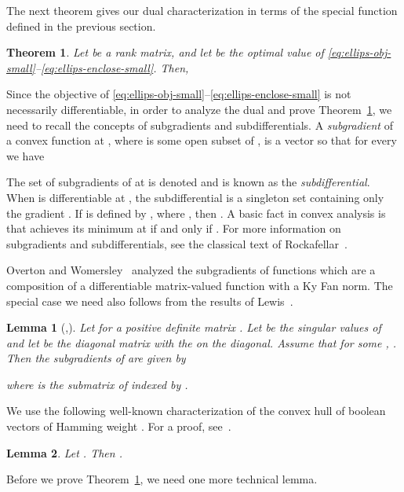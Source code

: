 \documentclass{article}
\newtheorem{theorem}{Theorem}[section]
\newtheorem{lemma}{Lemma}[theorem]
\begin{document}
The next theorem gives our dual characterization in terms of the
special function  defined in the previous section.

\begin{theorem}\label{thm:nuclear-small}
  Let  be a rank
   matrix, and let  be the optimal value of
  \eqref{eq:ellips-obj-small}--\eqref{eq:ellips-enclose-small}. Then,
  
\end{theorem}

Since the objective of
\eqref{eq:ellips-obj-small}--\eqref{eq:ellips-enclose-small} is not
necessarily differentiable, in order to analyze the dual and prove
Theorem~\ref{thm:nuclear-small}, we need to recall the concepts of
subgradients and subdifferentials. A \emph{subgradient} of a convex
function  at , where  is some open subset
of , is a vector  so that for every  we
have

The set of subgradients of  at  is denoted  and
is known as the \emph{subdifferential}. When  is differentiable at
, the subdifferential is a singleton set containing only the
gradient . If  is defined by ,
where  , then . A basic fact in convex analysis is that 
achieves its minimum at   if and only if . For
more information on subgradients and subdifferentials, see the
classical text of Rockafellar~\cite{Rockafellar}. 

Overton and Womersley~\cite{OvertonW93-kyfan} analyzed the
subgradients of functions which are a composition of a differentiable
matrix-valued function with a Ky Fan norm. The special case we need
also follows from the results of Lewis~\cite{Lewis95-matfunc}.
\begin{lemma}[\cite{OvertonW93-kyfan},\cite{Lewis95-matfunc}]\label{lm:kyfan-subgr}
  Let  for a positive definite
  matrix . Let  be the
  singular values of  and let  be the diagonal matrix
  with the  on the diagonal. Assume that for some , . Then the subgradients of  are
  given by
  
  where  is the submatrix of  indexed by . 
\end{lemma}

We use the following well-known characterization of the convex
hull of boolean vectors of Hamming weight . For a proof,
see~\cite{schrijver-combop-B}. 

\begin{lemma}\label{lm:unik-poly}
  Let . Then
  . 
\end{lemma}

Before we prove Theorem~\ref{thm:nuclear-small}, we need one more
technical lemma.
\end{document}
